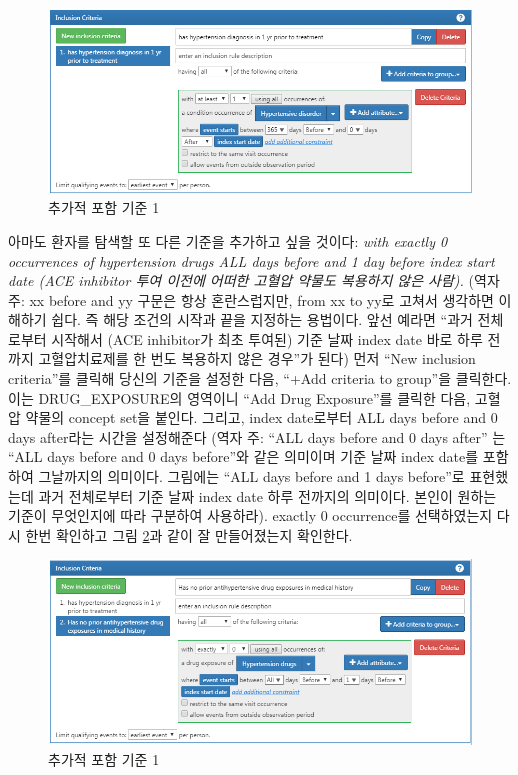 \documentclass[10.5pt]{book}
\theoremstyle{definition}
\theoremstyle{definition}
\theoremstyle{definition}
\theoremstyle{remark}
\begin{document}
\begin{figure}

{\centering \includegraphics[width=1\linewidth]{images/Cohorts/ATLAS-IC1} 

}

\caption{추가적 포함 기준 1}\label{fig:ATLASIC1}
\end{figure}

아마도 환자를 탐색할 또 다른 기준을 추가하고 싶을 것이다: \emph{with
exactly 0 occurrences of hypertension drugs ALL days before and 1 day
before index start date (ACE inhibitor 투여 이전에 어떠한 고혈압 약물도
복용하지 않은 사람).} (역자주: xx before and yy 구문은 항상
혼란스럽지만, from xx to yy로 고쳐서 생각하면 이해하기 쉽다. 즉 해당
조건의 시작과 끝을 지정하는 용법이다. 앞선 예라면 ``과거 전체로부터
시작해서 (ACE inhibitor가 최초 투여된) 기준 날짜 index date 바로 하루
전까지 고혈압치료제를 한 번도 복용하지 않은 경우''가 된다) 먼저 ``New
inclusion criteria''를 클릭해 당신의 기준을 설정한 다음, ``+Add criteria
to group''을 클릭한다. 이는 DRUG\_EXPOSURE의 영역이니 ``Add Drug
Exposure''를 클릭한 다음, 고혈압 약물의 concept set을 붙인다. 그리고,
index date로부터 ALL days before and 0 days after라는 시간을 설정해준다
(역자 주: ``ALL days before and 0 days after'' 는 ``ALL days before and
0 days before''와 같은 의미이며 기준 날짜 index date를 포함하여
그날까지의 의미이다. 그림에는 ``ALL days before and 1 days before''로
표현했는데 과거 전체로부터 기준 날짜 index date 하루 전까지의 의미이다.
본인이 원하는 기준이 무엇인지에 따라 구분하여 사용하라). exactly 0
occurrence를 선택하였는지 다시 한번 확인하고 그림 \ref{fig:ATLASIC2}과
같이 잘 만들어졌는지 확인한다.

\begin{figure}

{\centering \includegraphics[width=1\linewidth]{images/Cohorts/ATLAS-IC2} 

}

\caption{추가적 포함 기준 1}\label{fig:ATLASIC2}
\end{figure}
\end{document}

